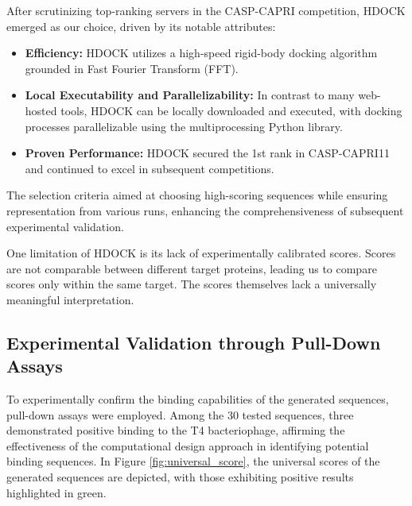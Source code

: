 \documentclass[11pt,a4paper]{article}
\begin{document}
After scrutinizing top-ranking servers in the CASP-CAPRI competition, HDOCK emerged as our choice, driven by its notable attributes:

\begin{itemize}
    \item \textbf{Efficiency:} HDOCK utilizes a high-speed rigid-body docking algorithm grounded in Fast Fourier Transform (FFT).
    \item \textbf{Local Executability and Parallelizability:} In contrast to many web-hosted tools, HDOCK can be locally downloaded and executed, with docking processes parallelizable using the multiprocessing Python library.
    \item \textbf{Proven Performance:} HDOCK secured the 1st rank in CASP-CAPRI11 and continued to excel in subsequent competitions.
\end{itemize}

The selection criteria aimed at choosing high-scoring sequences while ensuring representation from various runs, enhancing the comprehensiveness of subsequent experimental validation.

One limitation of HDOCK is its lack of experimentally calibrated scores. Scores are not comparable between different target proteins, leading us to compare scores only within the same target. The scores themselves lack a universally meaningful interpretation.


\subsection{Experimental Validation through Pull-Down Assays}

To experimentally confirm the binding capabilities of the generated sequences, pull-down assays were employed. Among the 30 tested sequences, three demonstrated positive binding to the T4 bacteriophage, affirming the effectiveness of the computational design approach in identifying potential binding sequences. In Figure \ref{fig:universal_score}, the universal scores of the generated sequences are depicted, with those exhibiting positive results highlighted in green.
\end{document}
